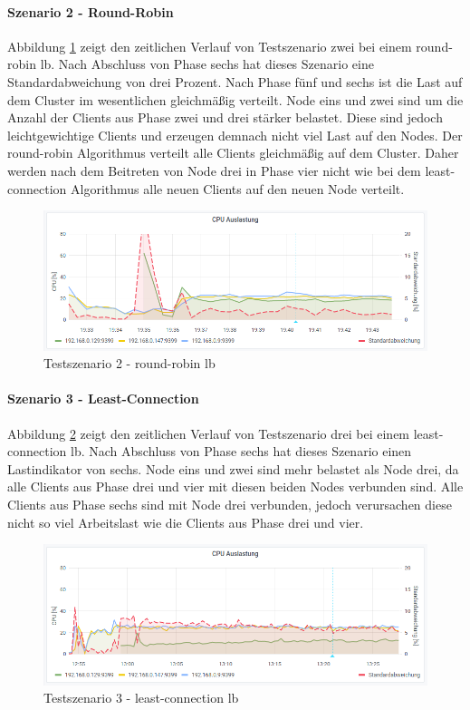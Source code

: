 \paragraph{Szenario 2 - Round-Robin}
Abbildung \ref{fig:s2-rr} zeigt den zeitlichen Verlauf von Testszenario zwei bei einem round-robin \ac{lb}.
Nach Abschluss von Phase sechs hat dieses Szenario eine Standardabweichung von drei Prozent.
Nach Phase fünf und sechs ist die Last auf dem Cluster im wesentlichen gleichmä{\ss}ig verteilt. Node eins und zwei sind um die Anzahl der Clients aus Phase zwei und drei stärker belastet. Diese sind jedoch leichtgewichtige Clients und erzeugen demnach nicht viel Last auf den Nodes.
Der round-robin Algorithmus verteilt alle Clients gleichmä{\ss}ig auf dem Cluster.
Daher werden nach dem Beitreten von Node drei in Phase vier nicht wie bei dem least-connection Algorithmus alle neuen Clients auf den neuen Node verteilt.
\begin{figure}[h]
    \centering
    \includegraphics[scale=0.8]{images/s2_rr.png}
    \caption{Testszenario 2 - round-robin \acl{lb}}
    \label{fig:s2-rr}
\end{figure}

\paragraph{Szenario 3 - Least-Connection}
Abbildung \ref{fig:s3-lc} zeigt den zeitlichen Verlauf von Testszenario drei bei einem least-connection \ac{lb}.
Nach Abschluss von Phase sechs hat dieses Szenario einen Lastindikator von sechs.
Node eins und zwei sind mehr belastet als Node drei, da alle Clients aus Phase drei und vier mit diesen beiden Nodes verbunden sind. Alle Clients aus Phase sechs sind mit Node drei verbunden, jedoch verursachen diese nicht so viel Arbeitslast wie die Clients aus Phase drei und vier.
\newpage
\begin{figure}[h]
    \centering
    \includegraphics[scale=0.8]{images/s3_lc.png}
    \caption{Testszenario 3 - least-connection \acl{lb}}
    \label{fig:s3-lc}
\end{figure}

